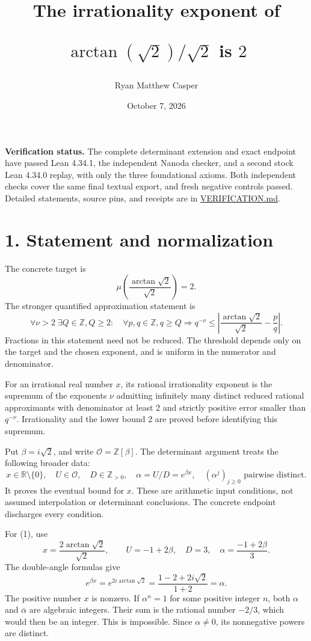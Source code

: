 \documentclass[11pt]{article}
\title{The irrationality exponent of\par $\arctan(\sqrt{2})/\sqrt{2}$ is $2$}
\author{Ryan Matthew Casper}
\date{October 7, 2026}
\begin{document}
\maketitle
\textbf{Verification status.} The complete determinant extension and
exact endpoint have passed Lean 4.34.1, the independent Nanoda checker,
and a second stock Lean 4.34.0 replay, with only the three foundational
axioms. Both independent checks cover the same final textual export, and
fresh negative controls passed. Detailed statements, source pins, and
receipts are in \href{lean/VERIFICATION.md}{VERIFICATION.md}.

\section{1. Statement and
normalization}\label{statement-and-normalization}

The concrete target is \[
\mu\!\left(\frac{\arctan\sqrt2}{\sqrt2}\right)=2.
\tag{1}
\] The stronger quantified approximation statement is \[
\forall\nu>2\;\exists Q\in\mathbb Z, Q\ge2:
\quad\forall p,q\in\mathbb Z, q\ge Q\Longrightarrow
q^{-\nu}\le
\left|\frac{\arctan\sqrt2}{\sqrt2}-\frac pq\right|.
\tag{2}
\] Fractions in this statement need not be reduced. The threshold
depends only on the target and the chosen exponent, and is uniform in
the numerator and denominator.

For an irrational real number \(x\), its rational irrationality exponent
is the supremum of the exponents \(\nu\) admitting infinitely many
distinct reduced rational approximants with denominator at least 2 and
strictly positive error smaller than \(q^{-\nu}\). Irrationality and the
lower bound 2 are proved before identifying this supremum.

Put \(\beta=i\sqrt2\), and write \(\mathcal O=\mathbb Z[\beta]\). The
determinant argument treats the following broader data: \[
x\in\mathbb R\setminus\{0\},\quad U\in\mathcal O,\quad
D\in\mathbb Z_{>0},\quad
\alpha=U/D=e^{\beta x},\quad
(\alpha^j)_{j\ge0}\text{ pairwise distinct}.
\tag{3}
\] It proves the eventual bound for \(x\). These are arithmetic input
conditions, not assumed interpolation or determinant conclusions. The
concrete endpoint discharges every condition.

For (1), use \[
x=\frac{2\arctan\sqrt2}{\sqrt2},\qquad
U=-1+2\beta,\quad D=3,
\quad \alpha=\frac{-1+2\beta}{3}.
\tag{4}
\] The double-angle formulas give \[
e^{\beta x}=e^{2i\arctan\sqrt2}
=\frac{1-2+2i\sqrt2}{1+2}=\alpha.
\] The positive number \(x\) is nonzero. If \(\alpha^n=1\) for some
positive integer \(n\), both \(\alpha\) and \(\bar\alpha\) are algebraic
integers. Their sum is the rational number \(-2/3\), which would then be
an integer. This is impossible. Since \(\alpha\ne0\), its nonnegative
powers are distinct.
\end{document}
